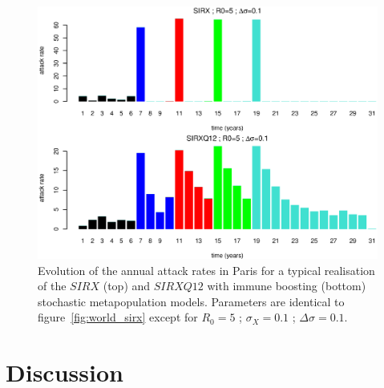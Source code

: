\begin{figure}[!htbp]
  \center
  \includegraphics[width=0.9\linewidth]{texte/article3/graph/attack_r05.eps}
  \caption{Evolution of the annual attack rates in Paris for a typical
    realisation of the $SIRX$ (top) and $SIRXQ12$ with immune boosting
    (bottom) stochastic metapopulation models. Parameters are
    identical to figure~\ref{fig:world_sirx} except for $R_0=5$ ;
    $\sigma_X=0.1$ ; $\Delta \sigma=0.1$.}
  \label{fig:attack5}
\end{figure}






\section{Discussion}
\label{sec:discussion}





